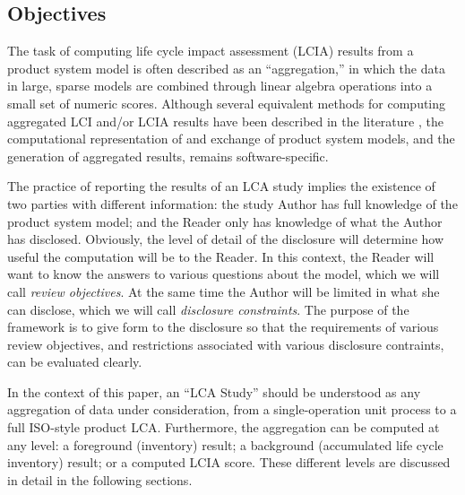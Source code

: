 \subsection{Objectives}

The task of computing life cycle impact assessment (LCIA) results from a product system model is often described as an ``aggregation,'' in which the data in large, sparse models are combined through linear algebra operations into a small set of numeric scores.  Although several equivalent methods for computing aggregated LCI and/or LCIA results have been described in the literature \citep{Suh_2005, Peters_2007}, the computational representation of and exchange of product system models, and the generation of aggregated results, remains software-specific.  

The practice of reporting the results of an LCA study implies the existence of two parties with different information: the study Author has full knowledge of the product system model; and the Reader only has knowledge of what the Author has disclosed.  Obviously, the level of detail of the disclosure will determine how useful the computation will be to the Reader.  In this context, the Reader will want to know the answers to various questions about the model, which we will call \emph{review objectives}.  
At the same time the Author will be limited in what she can disclose, which we will call \emph{disclosure constraints}.  The purpose of the framework is to give form to the disclosure so that the requirements of various review objectives, and restrictions associated with various disclosure contraints, can be evaluated clearly.

In the context of this paper, an ``LCA Study'' should be understood as any aggregation of data under consideration, from a single-operation unit process to a full ISO-style product LCA.  Furthermore, the aggregation can be computed at any level: a foreground (inventory) result; a background (accumulated life cycle inventory) result; or a computed LCIA score.  These different levels are discussed in detail in the following sections.  

